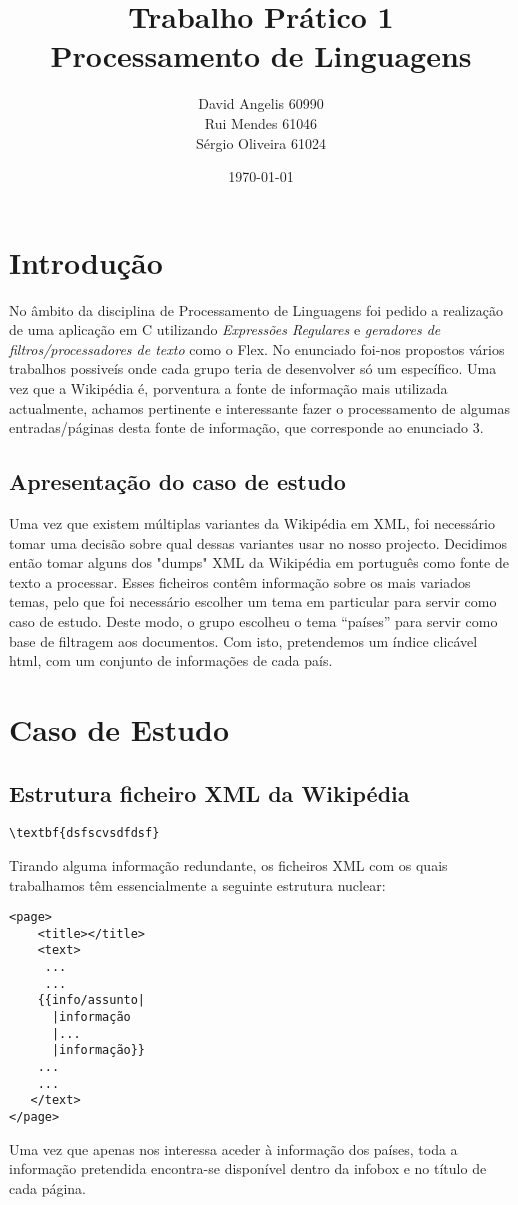 \documentclass[12pt,a4paper]{report}
\author{David Angelis 60990 \\Rui Mendes 61046 \\Sérgio Oliveira 61024}
\title{Trabalho Prático 1 \\Processamento de Linguagens }
\date{\today}
\begin{document}
\maketitle
 \tableofcontents
\chapter{Introdução}
No âmbito da disciplina de Processamento de Linguagens foi pedido a realização de uma aplicação em C utilizando \textit{Expressões Regulares} e \textit{geradores de filtros/processadores de texto} como o Flex. No enunciado foi-nos propostos vários trabalhos possiveís onde cada grupo teria de desenvolver só um específico. Uma vez que a Wikipédia é, porventura a fonte de informação mais utilizada actualmente, achamos pertinente e interessante fazer o processamento de algumas entradas/páginas desta fonte de informação, que corresponde ao enunciado 3. 
  
\section{Apresentação do caso de estudo}
Uma vez que existem múltiplas variantes da Wikipédia em XML, foi necessário tomar uma decisão sobre qual dessas variantes usar no nosso projecto. Decidimos então tomar alguns dos "dumps" XML da Wikipédia em português como fonte de texto a processar. Esses ficheiros contêm informação sobre os mais variados temas, pelo que foi necessário escolher um tema em particular para servir como caso de estudo. Deste modo, o grupo escolheu o tema ``países'' para servir como base de filtragem aos documentos. Com isto, pretendemos um índice clicável html, com um conjunto de informações de cada país. 
\newpage
\chapter{Caso de Estudo}

\section{Estrutura ficheiro XML da Wikipédia}
\begin{verbatim}
\textbf{dsfscvsdfdsf}
\end{verbatim}

Tirando alguma informação redundante, os ficheiros XML com os quais trabalhamos têm essencialmente a seguinte estrutura nuclear:
\begin{verbatim}
<page>
    <title></title>
    <text>
     ...
     ...
    {{info/assunto|
      |informação
      |...
      |informação}}
    ...
    ...
   </text>
</page>
\end{verbatim}
Uma vez que apenas nos interessa aceder à informação dos países, toda a informação pretendida encontra-se disponível dentro da infobox e no título de cada página.
\newpage
\end{document}

